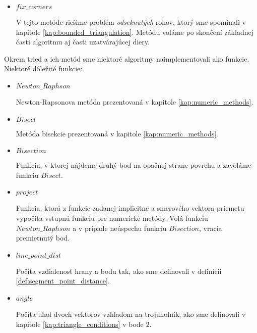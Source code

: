 \begin{itemize}
{\begin{itemize}
{                Metóda, v ktorej sa v správnom poradí volajú ďalšie metódy tak ako boli opísané v 
                kapitole \ref{kap:second_part_of_algorithm}. Tieto metódy sú rovnaké ako pre prvú
                časť algoritmu avšak vypúšťame v nich overovanie \textit{Delaunayovej podmienky} a
                podmienky s blízkosťou ťažiska.
                Ak sa nám v žiadnej z týchto metód neporadí nájsť nový trojuholník na konci kroku 
                označíme hranu $E = (x_i, x_j)$ za skontrolovanú.
            }
            \item{
                $fix\_corners$

                V tejto metóde riešime problém \textit{odseknutých} rohov, ktorý sme spomínali v
                kapitole \ref{kap:bounded_triangulation}.
                Metódu voláme po skončení základnej časti algoritmu aj časti uzatvárajúcej diery.
            }
        \end{itemize}
        }

\end{itemize}
Okrem tried a ich metód sme niektoré algoritmy naimplementovali ako funkcie. 
        Niektoré dôležité funkcie:
        \begin{itemize}
            \item{
                $Newton\_Raphson$

                Newton-Rapsonova metóda prezentovaná v kapitole \ref{kap:numeric_methods}.
            }
            \item{
                $Bisect$

                Metóda bisekcie prezentovaná v kapitole \ref{kap:numeric_methods}.
            }
            \item{
                $Bisection$

                Funkcia, v ktorej nájdeme druhý bod na opačnej strane povrchu a zavoláme
                funkciu $Bisect$.
            }
            \item{
                $project$

                Funkcia, ktorá z funkcie zadanej implicitne a smerového vektora priemetu
                vypočíta vstupnú funkciu pre numerické metódy. Volá funkciu $Newton\_Raphson$
                a v prípade neúspechu funkciu $Bisection$, vracia premietnutý bod.
            }
            \item{
                $line\_point\_dist$

                Počíta vzdialenosť hrany a bodu tak, ako sme definovali v definícii 
                \ref{def:segment_point_distance}.
            }
            \item{
                $angle$

                Počíta uhol dvoch vektorov vzhľadom na trojuholník, ako sme definovali v kapitole 
                \ref{kap:triangle_conditions} v bode $2$.
            }
        \end{itemize}
